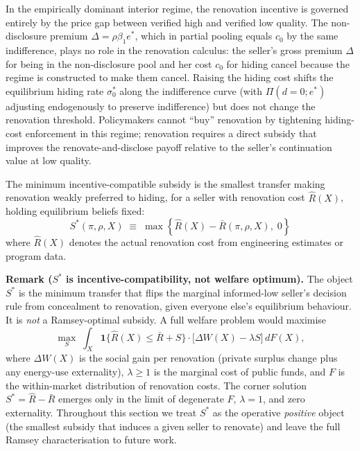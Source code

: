 \documentclass[10pt,letterpaper]{bp-template-concise}
\begin{document}
In the empirically dominant interior regime, the renovation incentive is governed entirely by the price gap between verified high and verified low quality. The non-disclosure premium $\Delta = \rho\beta_1 e^*$, which in partial pooling equals $c_0$ by the same indifference, plays no role in the renovation calculus: the seller's gross premium $\Delta$ for being in the non-disclosure pool and her cost $c_0$ for hiding cancel because the regime is constructed to make them cancel. Raising the hiding cost shifts the equilibrium hiding rate $\sigma_0^*$ along the indifference curve (with $\Pi(d=0;e^*)$ adjusting endogenously to preserve indifference) but does not change the renovation threshold. Policymakers cannot ``buy'' renovation by tightening hiding-cost enforcement in this regime; renovation requires a direct subsidy that improves the renovate-and-disclose payoff relative to the seller's continuation value at low quality.

\begin{definition}
\label{def:minimum_subsidy}
The minimum incentive-compatible subsidy is the smallest transfer making renovation weakly preferred to hiding, for a seller with renovation cost $\hat{R}(X)$, holding equilibrium beliefs fixed:
\begin{equation}
    S^*(\pi,\rho,X)\;\equiv\;\max\!\left\{\hat{R}(X)-\bar{R}(\pi,\rho,X),\;0\right\}
    \label{eq:subsidy}
\end{equation}
where $\hat{R}(X)$ denotes the actual renovation cost from engineering estimates or program data.
\end{definition}

\medskip\noindent\textbf{Remark ($S^*$ is incentive-compatibility, not welfare optimum).}\label{rem:welfare}
The object $S^*$ is the minimum transfer that flips the marginal informed-low seller's decision rule from concealment to renovation, given everyone else's equilibrium behaviour. It is \emph{not} a Ramsey-optimal subsidy. A full welfare problem would maximise
\[
    \max_S \; \int_X \mathbf{1}\{\hat R(X) \le \bar R + S\} \cdot \big[\Delta W(X) - \lambda S\big]\, dF(X),
\]
where $\Delta W(X)$ is the social gain per renovation (private surplus change plus any energy-use externality), $\lambda\ge 1$ is the marginal cost of public funds, and $F$ is the within-market distribution of renovation costs. The corner solution $S^* = \hat R - \bar R$ emerges only in the limit of degenerate $F$, $\lambda=1$, and zero externality. Throughout this section we treat $S^*$ as the operative \emph{positive} object (the smallest subsidy that induces a given seller to renovate) and leave the full Ramsey characterisation to future work.
\end{document}
